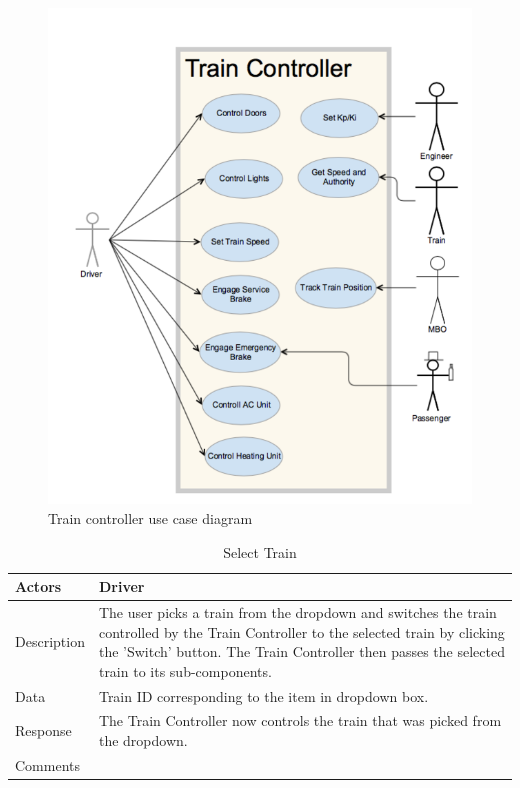\documentclass[]{article}
\begin{document}
\begin{figure}[H]
	\centering
	\includegraphics[scale=.2]{traincontrollerusecase.png}
	\caption{Train controller use case diagram}
\end{figure}

\begin{table}[H]
	\centering
	\caption{Select Train}
	\begin{tabular}{|l|l|}
		\hline
		Actors & \parbox[t]{10cm}{Driver} \\ \hline
		Description & \parbox[t]{10cm}{The user picks a train from the dropdown and switches the train controlled by the Train Controller to the selected train by clicking the 'Switch' button. The Train Controller then passes the selected train to its sub-components. } \\ \hline
		Data &  \parbox[t]{10cm}{Train ID corresponding to the item in dropdown box.} \\ \hline
		Response & \parbox[t]{10cm}{The Train Controller now controls the train that was picked from the dropdown.  }\\ \hline
		Comments & \parbox[t]{10cm}{}  \\ \hline
	\end{tabular}
\end{table}
\end{document}
